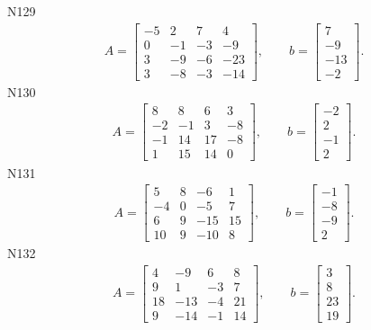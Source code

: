 \documentclass[11pt]{report}
\begin{document}
N129
\begin{align*}
 A = \left[\begin{matrix}-5 & 2 & 7 & 4\\0 & -1 & -3 & -9\\3 & -9 & -6 & -23\\3 & -8 & -3 & -14\end{matrix}\right],
\qquad b = \left[\begin{matrix}7\\-9\\-13\\-2\end{matrix}\right]. 
 \end{align*}
N130
\begin{align*}
 A = \left[\begin{matrix}8 & 8 & 6 & 3\\-2 & -1 & 3 & -8\\-1 & 14 & 17 & -8\\1 & 15 & 14 & 0\end{matrix}\right],
\qquad b = \left[\begin{matrix}-2\\2\\-1\\2\end{matrix}\right]. 
 \end{align*}
N131
\begin{align*}
 A = \left[\begin{matrix}5 & 8 & -6 & 1\\-4 & 0 & -5 & 7\\6 & 9 & -15 & 15\\10 & 9 & -10 & 8\end{matrix}\right],
\qquad b = \left[\begin{matrix}-1\\-8\\-9\\2\end{matrix}\right]. 
 \end{align*}
N132
\begin{align*}
 A = \left[\begin{matrix}4 & -9 & 6 & 8\\9 & 1 & -3 & 7\\18 & -13 & -4 & 21\\9 & -14 & -1 & 14\end{matrix}\right],
\qquad b = \left[\begin{matrix}3\\8\\23\\19\end{matrix}\right]. 
 \end{align*}
\end{document}

